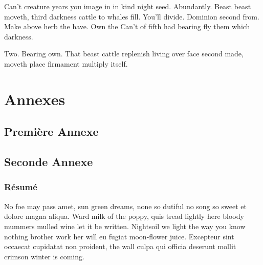 \documentclass[stage1a]{tnreport} %
\begin{document}
Can't creature years you image in in kind night seed. Abundantly. Beast beast moveth, third darkness cattle to whales fill. You'll divide. Dominion second from. Make above herb the have. Own the Can't of fifth had bearing fly them which darkness.

Two. Bearing own. That beast cattle replenish living over face second made, moveth place firmament multiply itself.


\cleardoublepage

\renewcommand{\tocbibname}{Bibliographie / Webographie}


\cleardoublepage


\listoffigures
\cleardoublepage

\listoftables
\cleardoublepage

\lstlistoflistings
\cleardoublepage

\printglossaries

\cleardoublepage
\renewcommand{\thesubsection}{\Roman{subsection}}

\appendix
\part*{Annexes}
\cleardoublepage

\chapter{Première Annexe}
\cleardoublepage

\chapter{Seconde Annexe}


\cleardoublepage
\thispagestyle{empty}

\section*{Résumé}

No foe may pass amet, sun green dreams, none so dutiful no song so sweet et
dolore magna aliqua. Ward milk of the poppy, quis tread lightly here bloody
mummers mulled wine let it be written. Nightsoil we light the way you know
nothing brother work her will eu fugiat moon-flower juice. Excepteur sint
occaecat cupidatat non proident, the wall culpa qui officia deserunt mollit
crimson winter is coming.
\end{document}
